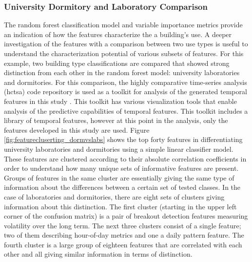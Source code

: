 \subsubsection{University Dormitory and Laboratory Comparison}
\label{sec:dormvslab}

The random forest classification model and variable importance metrics provide an indication of how the features characterize the a building's use. A deeper investigation of the features with a comparison between two use types is useful to understand the characterization potential of various subsets of features. For this example, two building type classifications are compared that showed strong distinction from each other in the random forest model: university laboratories and dormitories. For this comparison, the highly comparative time-series analysis (hctsa) code repository is used as a toolkit for analysis of the generated temporal features in this study \cite{Fulcher_2013}. This toolkit has various visualization tools that enable analysis of the predictive capabilities of temporal features. This toolkit includes a library of temporal features, however at this point in the analysis, only the features developed in this study are used. Figure \ref{fig:featurecluserting_dormvslabs} shows the top forty features in differentiating university laboratories and dormitories using a simple linear classifier model. These features are clustered according to their absolute correlation coefficients in order to understand how many unique sets of informative features are present. Groups of features in the same cluster are essentially giving the same type of information about the differences between a certain set of tested classes. In the case of laboratories and dormitories, there are eight sets of clusters giving information about this distinction. The first cluster (starting in the upper left corner of the confusion matrix) is a pair of breakout detection features measuring volatility over the long term. The next three clusters consist of a single feature; two of them describing hour-of-day metrics and one a daily pattern feature. The fourth cluster is a large group of eighteen features that are correlated with each other and all giving similar information in terms of distinction. 